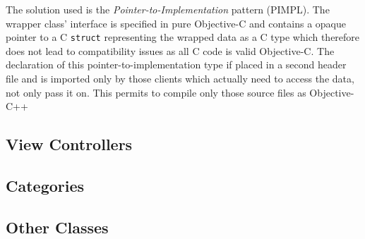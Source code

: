 The solution used is the \emph{Pointer-to-Implementation}
pattern (PIMPL). The wrapper class' interface is specified in pure Objective-C
and contains a opaque pointer to a C \texttt{struct} representing the wrapped
data as a C type which therefore does not lead to compatibility issues as
all C code is valid Objective-C. The declaration of this
pointer-to-implementation type if placed in a second header file and is imported
only by those clients which actually need to access the data, not only pass it
on. This permits to compile only those source files as Objective-C++

\subsection{View Controllers}

\subsection{Categories}

\subsection{Other Classes}


